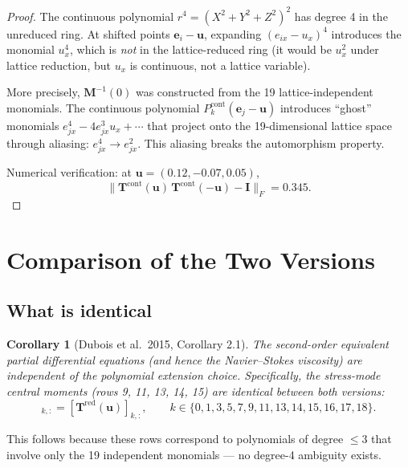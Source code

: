 \documentclass[11pt,a4paper]{article}
\newtheorem{corollary}{Corollary}[section]
\newcommand{\vect}[1]{\bm{#1}}
\newcommand{\mat}[1]{\bm{#1}}
\newcommand{\Tmat}{\mat{T}}
\newcommand{\Mmat}{\mat{M}}
\newcommand{\Imat}{\mat{I}}
\begin{document}
\begin{proof}
The continuous polynomial $r^4 = (X^2+Y^2+Z^2)^2$ has degree 4 in the unreduced ring.
At shifted points $\vect{e}_i - \vect{u}$, expanding $(e_{ix}-u_x)^4$ introduces the monomial $u_x^4$, which is \emph{not} in the lattice-reduced ring (it would be $u_x^2$ under lattice reduction, but $u_x$ is continuous, not a lattice variable).

More precisely, $\Mmat^{-1}(0)$ was constructed from the 19 lattice-independent monomials.
The continuous polynomial $P_k^{\text{cont}}(\vect{e}_j - \vect{u})$ introduces ``ghost'' monomials $e_{jx}^4 - 4e_{jx}^3 u_x + \cdots$ that project onto the 19-dimensional lattice space through aliasing: $e_{jx}^4 \to e_{jx}^2$.
This aliasing breaks the automorphism property.

Numerical verification: at $\vect{u} = (0.12, -0.07, 0.05)$,
\[
  \|\Tmat^{\text{cont}}(\vect{u})\,\Tmat^{\text{cont}}(-\vect{u}) - \Imat\|_F = 0.345.
\]
\end{proof}

\section{Comparison of the Two Versions}\label{sec:comparison}

\subsection{What is identical}

\begin{corollary}[Dubois et al.\ 2015, Corollary 2.1]\label{cor:viscosity}
The second-order equivalent partial differential equations (and hence the Navier--Stokes viscosity) are independent of the polynomial extension choice.
Specifically, the stress-mode central moments (rows 9, 11, 13, 14, 15) are \emph{identical} between both versions:
\begin{equation}
  [\Tmat^{\text{cont}}(\vect{u})]_{k,:} = [\Tmat^{\text{red}}(\vect{u})]_{k,:}, \qquad k \in \{0,1,3,5,7,9,11,13,14,15,16,17,18\}.
\end{equation}
\end{corollary}

This follows because these rows correspond to polynomials of degree $\leq 3$ that involve only the 19 independent monomials --- no degree-4 ambiguity exists.
\end{document}
